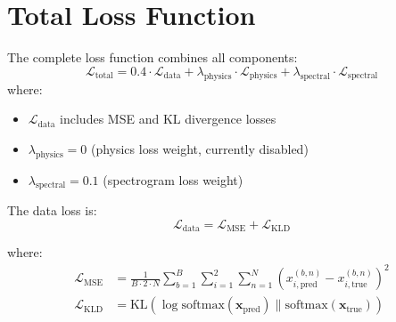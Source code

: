 \documentclass{article}
\begin{document}
\section{Total Loss Function}

The complete loss function combines all components:
\begin{equation}
\mathcal{L}_{\text{total}} = 0.4 \cdot \mathcal{L}_{\text{data}} + \lambda_{\text{physics}} \cdot \mathcal{L}_{\text{physics}} + \lambda_{\text{spectral}} \cdot \mathcal{L}_{\text{spectral}}
\end{equation}
where:
\begin{itemize}
\item $\mathcal{L}_{\text{data}}$ includes MSE and KL divergence losses
\item $\lambda_{\text{physics}} = 0$ (physics loss weight, currently disabled)
\item $\lambda_{\text{spectral}} = 0.1$ (spectrogram loss weight)
\end{itemize}

The data loss is:
\begin{equation}
\mathcal{L}_{\text{data}} = \mathcal{L}_{\text{MSE}} + \mathcal{L}_{\text{KLD}}
\end{equation}

where:
\begin{align}
\mathcal{L}_{\text{MSE}} &= \frac{1}{B \cdot 2 \cdot N} \sum_{b=1}^{B} \sum_{i=1}^{2} \sum_{n=1}^{N} (x_{i,\text{pred}}^{(b,n)} - x_{i,\text{true}}^{(b,n)})^2 \\
\mathcal{L}_{\text{KLD}} &= \text{KL}(\log \text{softmax}(\bm{x}_{\text{pred}}) \| \text{softmax}(\bm{x}_{\text{true}}))
\end{align}
\end{document}
